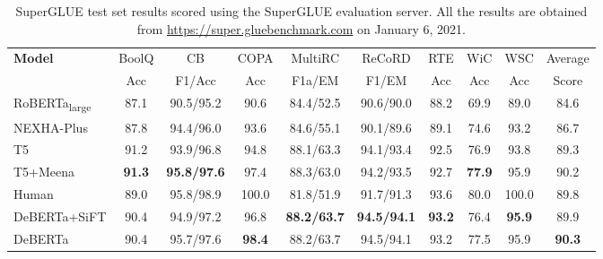 \begin{table*}[htb!]
    \centering
    \begin{tabular}{@{\hskip2pt}l@{\hskip2pt}|@{\hskip2pt} @{\hskip1pt}c@{\hskip1pt}|@{\hskip2pt}c@{\hskip1pt}|@{\hskip2pt}c@{\hskip1pt}|c@{\hskip1pt}|c@{\hskip1pt}|c@{\hskip1pt}|c@{\hskip1pt}|c@{\hskip1pt}|@{\hskip2pt}c@{\hskip1pt}}
        \toprule
        \multirow{2}{*}{\bf Model} & BoolQ &CB&COPA&MultiRC&ReCoRD&RTE&WiC&WSC& Average\\ 
         & Acc & F1/Acc & Acc &F1a/EM&F1/EM&Acc&Acc&Acc& Score\\
        \midrule
RoBERTa\textsubscript{large} & 87.1  & 90.5/95.2 & 90.6 &84.4/52.5&90.6/90.0&88.2&69.9 &89.0 &84.6\\  \hline
        NEXHA-Plus                  & 87.8  & 94.4/96.0 & 93.6 &84.6/55.1&90.1/89.6&89.1&74.6 &93.2 &86.7\\  \hline
        T5 &91.2  & 93.9/96.8 & 94.8 &88.1/63.3&94.1/93.4&92.5&76.9 &93.8 &89.3\\ 
        \hline
        T5+Meena &\textbf{91.3}  & \textbf{95.8/97.6} & 97.4 &88.3/63.0&94.2/93.5&92.7&\textbf{77.9} &95.9 &90.2\\ 
        \hline \hline
        Human  &89.0 & 95.8/98.9 & 100.0 &81.8/51.9&91.7/91.3&93.6&80.0 &100.0 &89.8\\  \hline \hline
        DeBERTa+SiFT &90.4  & 94.9/97.2 & 96.8&\textbf{88.2/63.7}&\textbf{94.5/94.1}&\textbf{93.2}&76.4 &	\textbf{95.9} & 89.9\\  
        DeBERTa &90.4  & 95.7/97.6 & \textbf{98.4}&88.2/63.7&94.5/94.1&93.2&77.5 &	95.9 & \textbf{90.3}\\
        \bottomrule
        \end{tabular}
    \caption{
SuperGLUE test set results scored using the SuperGLUE evaluation server. All the results are obtained from \href{https://super.gluebenchmark.com}{https://super.gluebenchmark.com} on January 6, 2021.
    }
    \label{tab:superglue}
    
\end{table*}
